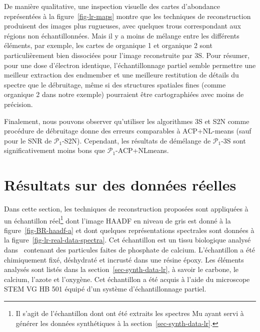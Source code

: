 De manière qualitative, une inspection visuelle des cartes d'abondance représentées à la figure~\ref{fig-lr-maps} montre que les techniques de reconstruction produisent des images plus rugueuses, avec quelques trous correspondant aux régions non échantillonnées. Mais il y a moins de mélange entre les différents éléments, par exemple, les cartes de organique 1 et organique 2 sont particulièrement bien dissociées pour l'image reconstruite par 3S. Pour résumer, pour une dose d'électron identique, l'échantillonnage partiel semble permettre une meilleur extraction des endmember et une meilleure restitution de détails du spectre que le débruitage, même si des structures spatiales fines (comme organique 2 dans notre exemple) pourraient être cartographiées avec moins de précision.

Finalement, nous pouvons observer qu'utiliser les algorithmes 3S et S2N comme procédure de débruitage donne des erreurs comparables à ACP+NL-means (sauf pour le SNR de $\mathcal{P}_1$-S2N). Cependant, les résultats de démélange de $\mathcal{P}_1$-3S sont significativement moins bons que $\mathcal{P}_1$-ACP+NLmeans. 



%
\section{Résultats sur des données réelles}\label{sec-3s-real-data}

Dans cette section, les techniques de reconstruction proposées sont appliquées à un échantillon réel\footnote{Il s'agit de l'échantillon dont ont été extraits les spectres \gls{Mu} ayant servi à générer les données synthétiques à la section~\ref{sec-synth-data-lr}.} dont l'image HAADF en niveau de gris est donné à la figure~\ref{fig-BR-haadf-a} et dont quelques représentations spectrales sont données à la figure~\ref{fig-lr-real-data-spectra}. 
%
Cet échantillon est un tissu biologique analysé dans~\cite{gay2020nanoscale} contenant des particules faites de phosphate de calcium. L'échantillon a été chimiquement fixé, déshydraté et incrusté dans une résine époxy. Les éléments analysés sont listés dans la section~\ref{sec-synth-data-lr}, à savoir le carbone, le calcium, l'azote et l'oxygène. Cet échantillon a été acquis à l'aide du microscope STEM VG HB 501 équipé d'un système d'échantillonnage partiel.

